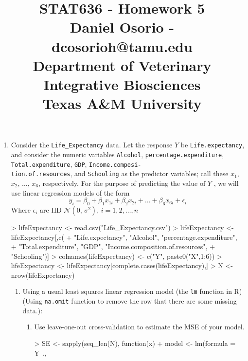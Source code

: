 \documentclass[12pt,a4paper]{paper}
\begin{document}
\title{STAT636 - Homework 5\\\small{Daniel Osorio - dcosorioh@tamu.edu\\Department of Veterinary Integrative Biosciences\\Texas A\&M University}}
\maketitle

\begin{enumerate}
\item Consider the \texttt{Life\_Expectancy} data. Let the response $Y$ be \texttt{Life.expectancy}, and consider the numeric variables \texttt{Alcohol}, \texttt{percentage.expenditure}, \texttt{Total.expenditure}, \texttt{GDP}, \texttt{Income.composi-\\tion.of.resources}, and \texttt{Schooling} as the predictor variables; call these $x_1$, $x_2$, $\dots$, $x_6$, respectively. For the purpose of predicting the value of $Y$ , we will use linear regression models of the form
\begin{equation*}
y_{i} =\beta_{0} +\beta_{1}x_{1i} +\beta_{2}x_{2i} +\dots+\beta_{6}x_{6i} + \epsilon_{i}
\end{equation*}
Where $\epsilon_{i}$ are IID $\mathcal{N}(0,\,\sigma^{2})$, $i = 1, 2, \dots, n$
\begin{Schunk}
\begin{Sinput}
> lifeExpectancy <- read.csv("Life_Expectancy.csv")
> lifeExpectancy <- lifeExpectancy[,c(
+   "Life.expectancy", "Alcohol", "percentage.expenditure", 
+   "Total.expenditure", "GDP", "Income.composition.of.resources", 
+   "Schooling")]
> colnames(lifeExpectancy) <- c("Y", paste0("X",1:6))
> lifeExpectancy <- lifeExpectancy[complete.cases(lifeExpectancy),]
> N <- nrow(lifeExpectancy)
\end{Sinput}
\end{Schunk}
\begin{enumerate}
\item Using a usual least squares linear regression model (the \texttt{lm} function in R) (Using \texttt{na.omit} function to remove the row that there are some missing data.):
\begin{enumerate}
\item Use leave-one-out cross-validation to estimate the MSE of your model.
\begin{Schunk}
\begin{Sinput}
> SE <- sapply(seq_len(N), function(x){
+   model <- lm(formula = Y~., 
}
\end{Sinput}
\end{Schunk}
\end{enumerate}
\end{enumerate}
\end{enumerate}
\end{document}
